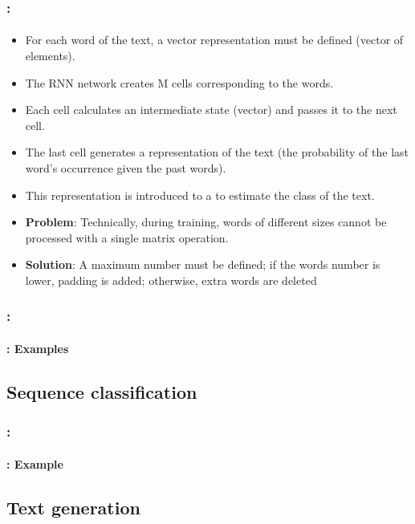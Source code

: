 \documentclass[xcolor=table]{beamer}
\begin{document}
\begin{frame}
	\frametitle{\insertshortsubtitle: \insertsection}
	\framesubtitle{\insertsubsection}
	
	\begin{itemize}
		\item For each word of the text, a vector representation must be defined (vector of  elements).
		\item The RNN network creates M cells corresponding to the  words.
		\item Each cell calculates an intermediate state (vector) and passes it to the next cell.
		\item The last cell generates a representation of the text (the probability of the last word's occurrence given the past words).
		\item This representation is introduced to a  to estimate the class of the text.
		\item \textbf{Problem}: Technically, during training, words of different sizes cannot be processed with a single matrix operation.
		\item \textbf{Solution}: \textcolor{yellow!30}{A maximum number must be defined; if the words number is lower, padding is added; otherwise, extra words are deleted}
	\end{itemize}
	
\end{frame}

\begin{frame}
	\frametitle{\insertshortsubtitle: \insertsection}
	\framesubtitle{\insertsubsection: Examples}
	
	
\end{frame}


\subsection{Sequence classification}

\begin{frame}
	\frametitle{\insertshortsubtitle: \insertsection}
	\framesubtitle{\insertsubsection: Example}
	
	
\end{frame}

\subsection{Text generation}
\end{document}
